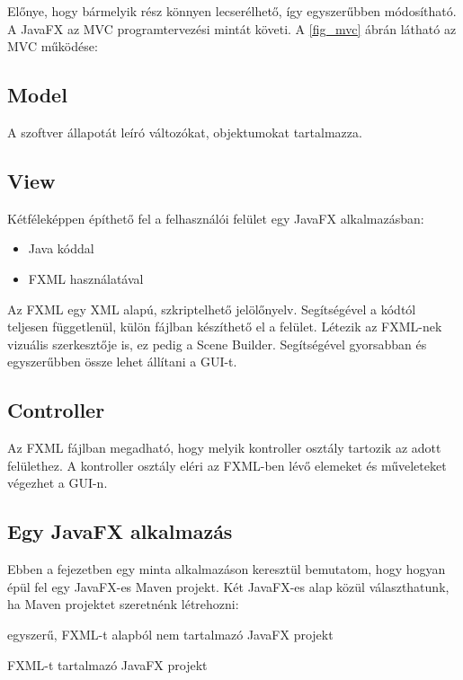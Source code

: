 Előnye, hogy bármelyik rész könnyen lecserélhető, így egyszerűbben módosítható. A JavaFX az MVC programtervezési mintát követi. A \ref{fig_mvc} ábrán látható az MVC működése:



\subsection*{Model} 

A szoftver állapotát leíró változókat, objektumokat tartalmazza. 

\subsection*{View}

Kétféleképpen építhető fel a felhasználói felület egy JavaFX alkalmazásban: 

\begin{itemize}
\item Java kóddal 
\item FXML használatával 
\end{itemize}

Az FXML egy XML alapú, szkriptelhető jelölőnyelv. Segítségével a kódtól teljesen függetlenül, külön fájlban készíthető el a felület. Létezik az FXML-nek vizuális szerkesztője is, ez pedig a Scene Builder. Segítségével gyorsabban és egyszerűbben össze lehet állítani a GUI-t. 

\subsection*{Controller}

Az FXML fájlban megadható, hogy melyik kontroller osztály tartozik az adott felülethez. A kontroller osztály eléri az FXML-ben lévő elemeket és műveleteket végezhet a GUI-n.


\subsection{Egy JavaFX alkalmazás}

Ebben a fejezetben egy minta alkalmazáson keresztül bemutatom, hogy hogyan épül fel egy JavaFX-es Maven projekt. Két JavaFX-es alap közül választhatunk, ha Maven projektet szeretnénk létrehozni: 

egyszerű, FXML-t alapból nem tartalmazó JavaFX projekt 

FXML-t tartalmazó JavaFX projekt 


